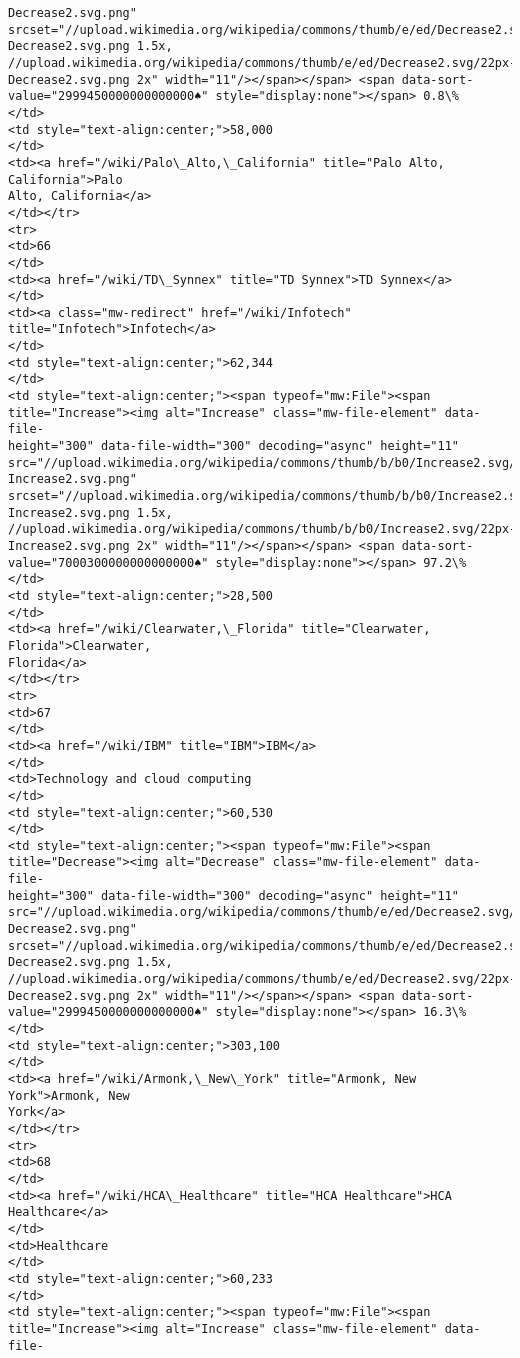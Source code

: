 \documentclass[11pt]{article}
\begin{document}
\begin{Verbatim}[commandchars=\\\{\}]
Decrease2.svg.png"
srcset="//upload.wikimedia.org/wikipedia/commons/thumb/e/ed/Decrease2.svg/17px-
Decrease2.svg.png 1.5x,
//upload.wikimedia.org/wikipedia/commons/thumb/e/ed/Decrease2.svg/22px-
Decrease2.svg.png 2x" width="11"/></span></span> <span data-sort-
value="2999450000000000000♠" style="display:none"></span> 0.8\%
</td>
<td style="text-align:center;">58,000
</td>
<td><a href="/wiki/Palo\_Alto,\_California" title="Palo Alto, California">Palo
Alto, California</a>
</td></tr>
<tr>
<td>66
</td>
<td><a href="/wiki/TD\_Synnex" title="TD Synnex">TD Synnex</a>
</td>
<td><a class="mw-redirect" href="/wiki/Infotech" title="Infotech">Infotech</a>
</td>
<td style="text-align:center;">62,344
</td>
<td style="text-align:center;"><span typeof="mw:File"><span
title="Increase"><img alt="Increase" class="mw-file-element" data-file-
height="300" data-file-width="300" decoding="async" height="11"
src="//upload.wikimedia.org/wikipedia/commons/thumb/b/b0/Increase2.svg/11px-
Increase2.svg.png"
srcset="//upload.wikimedia.org/wikipedia/commons/thumb/b/b0/Increase2.svg/17px-
Increase2.svg.png 1.5x,
//upload.wikimedia.org/wikipedia/commons/thumb/b/b0/Increase2.svg/22px-
Increase2.svg.png 2x" width="11"/></span></span> <span data-sort-
value="7000300000000000000♠" style="display:none"></span> 97.2\%
</td>
<td style="text-align:center;">28,500
</td>
<td><a href="/wiki/Clearwater,\_Florida" title="Clearwater, Florida">Clearwater,
Florida</a>
</td></tr>
<tr>
<td>67
</td>
<td><a href="/wiki/IBM" title="IBM">IBM</a>
</td>
<td>Technology and cloud computing
</td>
<td style="text-align:center;">60,530
</td>
<td style="text-align:center;"><span typeof="mw:File"><span
title="Decrease"><img alt="Decrease" class="mw-file-element" data-file-
height="300" data-file-width="300" decoding="async" height="11"
src="//upload.wikimedia.org/wikipedia/commons/thumb/e/ed/Decrease2.svg/11px-
Decrease2.svg.png"
srcset="//upload.wikimedia.org/wikipedia/commons/thumb/e/ed/Decrease2.svg/17px-
Decrease2.svg.png 1.5x,
//upload.wikimedia.org/wikipedia/commons/thumb/e/ed/Decrease2.svg/22px-
Decrease2.svg.png 2x" width="11"/></span></span> <span data-sort-
value="2999450000000000000♠" style="display:none"></span> 16.3\%
</td>
<td style="text-align:center;">303,100
</td>
<td><a href="/wiki/Armonk,\_New\_York" title="Armonk, New York">Armonk, New
York</a>
</td></tr>
<tr>
<td>68
</td>
<td><a href="/wiki/HCA\_Healthcare" title="HCA Healthcare">HCA Healthcare</a>
</td>
<td>Healthcare
</td>
<td style="text-align:center;">60,233
</td>
<td style="text-align:center;"><span typeof="mw:File"><span
title="Increase"><img alt="Increase" class="mw-file-element" data-file-

\end{Verbatim}
\end{document}
